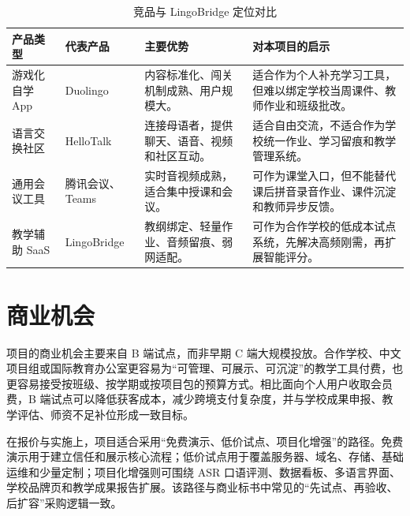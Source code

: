 \begin{table}[H]
\centering
\caption{竞品与 LingoBridge 定位对比}
\begin{tabularx}{\textwidth}{p{2.6cm} p{3.5cm} p{3.8cm} X}
\toprule
\textbf{产品类型} & \textbf{代表产品} & \textbf{主要优势} & \textbf{对本项目的启示} \\
\midrule
游戏化自学 App & Duolingo & 内容标准化、闯关机制成熟、用户规模大。 & 适合作为个人补充学习工具，但难以绑定学校当周课件、教师作业和班级批改。 \\
语言交换社区 & HelloTalk & 连接母语者，提供聊天、语音、视频和社区互动。 & 适合自由交流，不适合作为学校统一作业、学习留痕和教学管理系统。 \\
通用会议工具 & 腾讯会议、Teams & 实时音视频成熟，适合集中授课和会议。 & 可作为课堂入口，但不能替代课后拼音录音作业、课件沉淀和教师异步反馈。 \\
教学辅助 SaaS & LingoBridge & 教纲绑定、轻量作业、音频留痕、弱网适配。 & 可作为合作学校的低成本试点系统，先解决高频刚需，再扩展智能评分。 \\
\bottomrule
\end{tabularx}
\end{table}

\section{商业机会}
项目的商业机会主要来自 B 端试点，而非早期 C 端大规模投放。合作学校、中文项目组或国际教育办公室更容易为“可管理、可展示、可沉淀”的教学工具付费，也更容易接受按班级、按学期或按项目包的预算方式。相比面向个人用户收取会员费，B 端试点可以降低获客成本，减少跨境支付复杂度，并与学校成果申报、教学评估、师资不足补位形成一致目标。

在报价与实施上，项目适合采用“免费演示、低价试点、项目化增强”的路径。免费演示用于建立信任和展示核心流程；低价试点用于覆盖服务器、域名、存储、基础运维和少量定制；项目化增强则可围绕 ASR 口语评测、数据看板、多语言界面、学校品牌页和教学成果报告扩展。该路径与商业标书中常见的“先试点、再验收、后扩容”采购逻辑一致。
